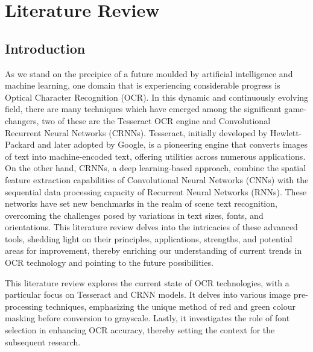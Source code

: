\chapter{Literature Review}
\label{chap:litreview}


\section{Introduction}



As we stand on the precipice of a future moulded by artificial intelligence and machine learning, one domain that is experiencing considerable progress is Optical Character Recognition (OCR). In this dynamic and continuously evolving field, there are many techniques which have emerged among the significant game-changers, two of these are the Tesseract OCR engine and Convolutional Recurrent Neural Networks (CRNNs). Tesseract, initially developed by Hewlett-Packard and later adopted by Google, is a pioneering engine that converts images of text into machine-encoded text, offering utilities across numerous applications. On the other hand, CRNNs, a deep learning-based approach, combine the spatial feature extraction capabilities of Convolutional Neural Networks (CNNs) with the sequential data processing capacity of Recurrent Neural Networks (RNNs). These networks have set new benchmarks in the realm of scene text recognition, overcoming the challenges posed by variations in text sizes, fonts, and orientations. This literature review delves into the intricacies of these advanced tools, shedding light on their principles, applications, strengths, and potential areas for improvement, thereby enriching our understanding of current trends in OCR technology and pointing to the future possibilities.



This literature review explores the current state of OCR technologies, with a particular focus on Tesseract and CRNN models. It delves into various image pre-processing techniques, emphasizing the unique method of red and green colour masking before conversion to grayscale. Lastly, it investigates the role of font selection in enhancing OCR accuracy, thereby setting the context for the subsequent research.

